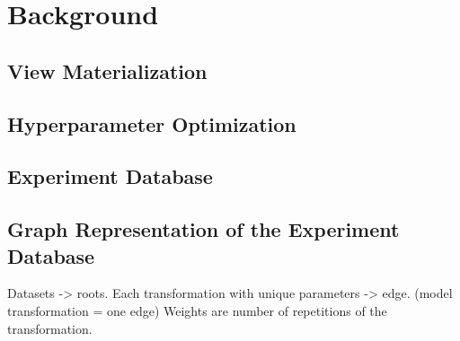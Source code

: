 \section{Background} \label{sec-background}
\subsection{View Materialization}
\subsection{Hyperparameter Optimization}
\subsection{Experiment Database}
\subsection{Graph Representation of the Experiment Database}
Datasets -> roots.
Each transformation with unique parameters -> edge. (model transformation = one edge)
Weights are number of repetitions of the transformation.
